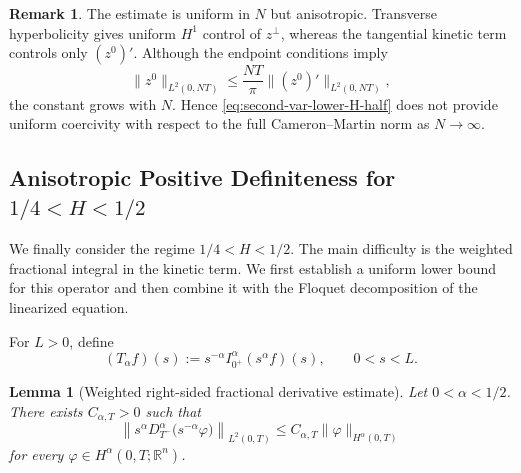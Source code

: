 \documentclass[preprint,12pt]{elsarticle}
\newtheorem{lemma}[theorem]{Lemma}
\theoremstyle{definition}
\newtheorem{remark}{Remark}[section]
\theoremstyle{plain}
\begin{document}
\begin{remark}
The estimate is uniform in $N$ but anisotropic. Transverse
hyperbolicity gives uniform $H^1$ control of $z^\perp$, whereas the
tangential kinetic term controls only $(z^0)'$. Although the endpoint
conditions imply
\begin{equation*}
    \|z^0\|_{L^2(0,NT)}
    \leq
    \frac{NT}{\pi}
    \|(z^0)'\|_{L^2(0,NT)},
\end{equation*}
the constant grows with $N$. Hence
\eqref{eq:second-var-lower-H-half} does not provide uniform coercivity
with respect to the full Cameron--Martin norm as $N\to\infty$.
\end{remark}
\subsection{Anisotropic Positive Definiteness for $1/4<H<1/2$}

We finally consider the regime $1/4<H<1/2$.
The main difficulty is the weighted fractional integral in the kinetic
term. We first establish a uniform lower bound for this operator and then
combine it with the Floquet decomposition of the linearized equation.

For $L>0$, define
\begin{equation*}
    (T_\alpha f)(s)
    :=
    s^{-\alpha}I_{0^+}^{\alpha}(s^\alpha f)(s),
    \qquad
    0<s<L.
\end{equation*}

\begin{lemma}[Weighted right-sided fractional derivative estimate]
\label{lem:weighted-right-fractional-derivative}
Let $0<\alpha<1/2$. There exists $C_{\alpha,T}>0$ such that
\begin{equation}
\label{eq:weighted-right-fractional-derivative}
    \left\|
        s^\alpha
        D_{T^-}^{\alpha}
        \bigl(s^{-\alpha}\varphi\bigr)
    \right\|_{L^2(0,T)}
    \leq
    C_{\alpha,T}
    \|\varphi\|_{H^\alpha(0,T)}
\end{equation}
for every $\varphi\in H^\alpha(0,T;\mathbb R^n)$.
\end{lemma}
    
\end{document}
